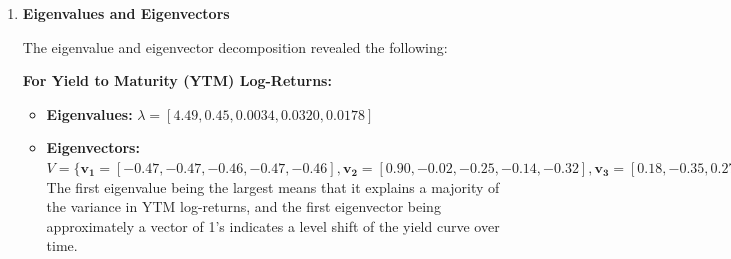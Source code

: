 \documentclass{article}
\begin{document}
\begin{enumerate}
\begin{table}[h!]
    \centering
    \begin{minipage}{0.48\textwidth}
        \centering
        \caption{Covariance Matrix of YTM Log Returns (Standardized)}
        \label{tab:covariance_ytm}
        \resizebox{\linewidth}{!}{%
        \[
        \begin{bmatrix}
            1.0000 & 0.7754 & 0.6754 & 0.7294 & 0.6399 \\
            0.7754 & 1.0000 & 0.9731 & 0.9695 & 0.9612 \\
            0.6754 & 0.9731 & 1.0000 & 0.9796 & 0.9778 \\
            0.7294 & 0.9695 & 0.9796 & 1.0000 & 0.9857 \\
            0.6399 & 0.9612 & 0.9778 & 0.9857 & 1.0000
        \end{bmatrix}
        \]
        }
    \end{minipage}
    \hfill
    \begin{minipage}{0.48\textwidth}
        \centering
        \caption{Covariance Matrix of Forward Rate Log Returns (Standardized)}
        \label{tab:covariance_forward}
        \resizebox{\linewidth}{!}{%
        \[
        \begin{bmatrix}
            1.0000 & 0.9711 & 0.9346 & 0.9643 \\
            0.9711 & 1.0000 & 0.9581 & 0.9681 \\
            0.9346 & 0.9581 & 1.0000 & 0.9855 \\
            0.9643 & 0.9681 & 0.9855 & 1.0000
        \end{bmatrix}
        \]
        }
    \end{minipage}
\end{table}

\item \textbf{Eigenvalues and Eigenvectors}

   	  The eigenvalue and eigenvector decomposition revealed the following:

    \textbf{For Yield to Maturity (YTM) Log-Returns:}
    \begin{itemize}
        \item \textbf{Eigenvalues:} $\lambda = [4.49, 0.45, 0.0034, 0.0320, 0.0178]$
        \item \textbf{Eigenvectors:}
        $V = \{ \mathbf{v_1} = [-0.47, -0.47, -0.46, -0.47, -0.46], \mathbf{v_2} = [0.90, -0.02, -0.25, -0.14, -0.32], \mathbf{v_3} = [0.18, -0.35, 0.27, -0.65, 0.60], \mathbf{v_4} = [0.10, -0.64, -0.37, 0.56, 0.37], \mathbf{v_5} = [-0.06, 0.50, -0.72, -0.18, 0.44] \}$
        The first eigenvalue being the largest means that it explains a majority of the variance in YTM log-returns, and the first eigenvector being approximately a vector of 1's indicates a level shift of the yield curve over time.  
    \end{itemize}


\end{enumerate}
\end{document}
